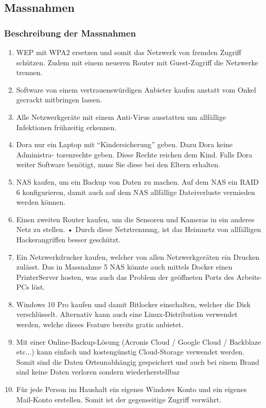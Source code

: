 

\subsection{Massnahmen}

\subsubsection{Beschreibung der Massnahmen}
\begin{enumerate}

\item WEP mit WPA2 ersetzen und somit das Netzwerk von fremden Zugriff schützen. Zudem mit einem neueren Router mit Guest-Zugriff die Netzwerke trennen.

\item Software von einem vertrauenswürdigen Anbieter kaufen anstatt vom Onkel gecrackt mitbringen lassen.

\item Alle Netzwerkgeräte mit einem Anti-Virus ausstatten um allfällige Infektionen frühzeitig erkennen.

\item Dora nur ein Laptop mit “Kindersicherung” geben. Dazu Dora keine Administra-
torenrechte geben. Diese Rechte reichen dem Kind. Falls Dora weiter Software benötigt, muss Sie diese bei den Eltern erhalten.

\item NAS kaufen, um ein Backup von Daten zu machen. Auf dem NAS ein RAID 6 konfigurieren, damit auch auf dem NAS allfällige Dateiverluste vermieden werden können.

\item Einen zweiten Router kaufen, um die Sensoren und Kameras in ein anderes Netz
zu stellen.
• Durch diese Netztrennung, ist das Heimnetz von allfälligen Hackerangriffen
besser geschützt.



\item Ein Netzwerkdrucker kaufen, welcher von allen Netzwerkgeräten ein Drucken zulässt. Das in Massnahme 5 NAS könnte auch mittels Docker einen PrinterServer hosten, was auch das Problem der geöffneten Ports des Arbeits-PCs löst.


\item Windows 10 Pro kaufen und damit Bitlocker einschalten, welcher die Disk verschlüsselt. Alternativ kann auch eine Linux-Distribution verwendet werden, welche dieses Feature bereits gratis anbietet.

\item Mit einer Online-Backup-Lösung (Acronis Cloud / Google Cloud / Backblaze etc...) kann einfach und kostengünstig Cloud-Storage verwendet werden. Somit sind die Daten Ortsunabhängig gespeichert und auch bei einem Brand sind keine Daten verloren sondern wiederherstellbar


\item Für jede Person im Haushalt ein eigenes Windows Konto und ein eigenes Mail-Konto erstellen. Somit ist der gegenseitige Zugriff verwährt. 




\end{enumerate}

